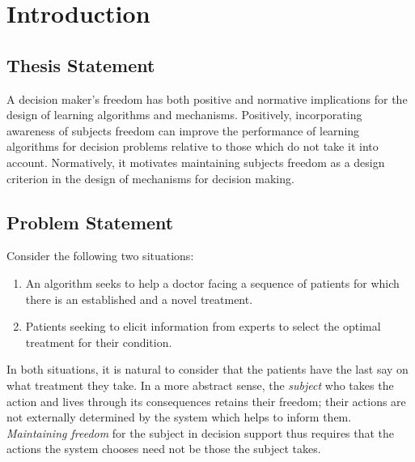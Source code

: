 \chapter{Introduction}
\label{cha:intro}



\section{Thesis Statement}
\label{sec:thesisstatement}

A decision maker's freedom has both positive and normative implications for the design of learning algorithms and mechanisms.
Positively, incorporating awareness of subjects freedom can improve the performance of learning algorithms for decision problems relative to those which do not take it into account.
Normatively, it motivates maintaining subjects freedom as a design criterion in the design of mechanisms for decision making.

\section{Problem Statement}
\label{sec:problemstatement}

Consider the following two situations:

\begin{enumerate}
	\item An algorithm seeks to help a doctor facing a sequence of patients for which there is an established and a novel treatment.
	\item Patients seeking to elicit information from experts to select the optimal treatment for their condition.
\end{enumerate}

In both situations, it is natural to consider that the patients have the last say on what treatment they take.
In a more abstract sense, the \emph{subject} who takes the action and lives through its consequences retains their freedom; their actions are not externally determined by the system which helps to inform them.
\emph{Maintaining freedom} for the subject in decision support thus requires that the actions the system chooses need not be those the subject takes.

